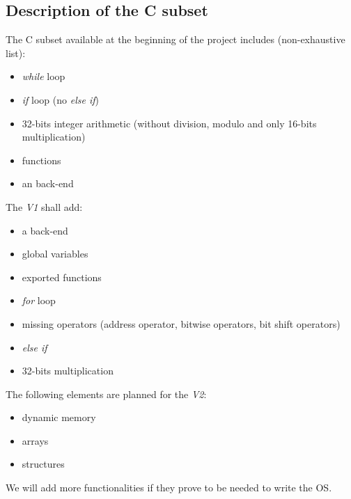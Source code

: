 \documentclass{article}
\begin{document}
  \begin{appendix}
    \section{Description of the C subset}\label{app:C89}
      The C subset available at the beginning of the project includes
      (non-exhaustive list):
      \begin{itemize}
        \item \textit{while} loop
        \item \textit{if} loop (no \textit{else if})
        \item 32-bits integer arithmetic (without division, modulo and only
          16-bits multiplication)
        \item functions
        \item an  back-end
      \end{itemize}

      \noindent The \textit{V1} shall add:
      \begin{itemize}
        \item a  back-end
        \item global variables
        \item exported functions
        \item \textit{for} loop
        \item missing operators (address operator, bitwise operators, bit shift
          operators)
        \item \textit{else if}
        \item 32-bits multiplication
      \end{itemize}

      \noindent The following elements are planned for the \textit{V2}:
      \begin{itemize}
        \item dynamic memory
        \item arrays
        \item structures
      \end{itemize}
      We will add more functionalities if they prove to be needed to write the
      OS. 
  \end{appendix}
\end{document}
